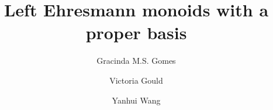 \documentclass[12pt]{amsart}
\theoremstyle{definition}
\theoremstyle{definition}
\numberwithin{them}{section}
\numberwithin{equation}{section}
\begin{document}
\title{Left Ehresmann monoids with a proper basis}


\author{Gracinda M.S. Gomes}

\address{Departamento de Ci\^{e}ncias Matem\'{a}ticas \\ Faculdade de Ci\^{e}ncias\\ Universidade de Lisboa\\ 1749-016\\ Lisboa\\ Portugal}



\author{Victoria Gould}

\address{Department of Mathematics\\University   of York\\Heslington\\York YO10 5GH\\UK}


\author{Yanhui Wang}
\address{College of Mathematics and Systems Science\\ Shangdong University of Science and Technology\\ Qingdao\\ 266590\\ PR China}


\end{document}
